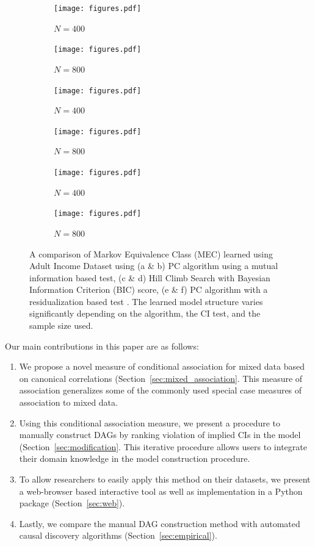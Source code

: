 \documentclass{uai2025} %
\begin{document}
\begin{figure}[t!]
\begin{subfigure}{0.25 \textwidth}
	\texttt{[image: figures.pdf]}
	\caption{$ N = 400 $}
\end{subfigure}%
\begin{subfigure}{0.25 \textwidth}
	\texttt{[image: figures.pdf]}
	\caption{$ N = 800$ }
\end{subfigure}
\begin{subfigure}{0.25 \textwidth}
	\texttt{[image: figures.pdf]}
	\caption{$ N = 400 $ }
\end{subfigure}%
\begin{subfigure}{0.25\textwidth}
	\texttt{[image: figures.pdf]}
	\caption{ $ N = 800$ }
\end{subfigure}
\begin{subfigure}{0.25 \textwidth}
	\texttt{[image: figures.pdf]}
	\caption{ $ N = 400$ }
\end{subfigure}%
\begin{subfigure}{0.25\textwidth}
	\texttt{[image: figures.pdf]}
	\caption{$ N = 800$ }
\end{subfigure}

\caption{A comparison of Markov Equivalence Class (MEC) learned using Adult Income Dataset \citep{Becker1996} using (a \& b) PC algorithm using a mutual information based test, (c \& d) Hill Climb Search with Bayesian Information Criterion (BIC) score, (e \& f) PC algorithm with a residualization based test \citep{Ankan2023}. The learned model structure varies significantly depending on the algorithm, the CI test, and the sample size used.}
\label{fig:intro}
\end{figure}


Our main contributions in this paper are as follows:
\begin{enumerate}
	\item We propose a novel measure of conditional association for mixed
		data based on canonical correlations
		(Section~\ref{sec:mixed_association}. This measure of
		association generalizes some of the commonly used special case
		measures of association to mixed data.
	\item Using this conditional association measure, we present a
		procedure to manually construct DAGs by ranking violation of
		implied CIs in the model (Section~\ref{sec:modification}. This
		iterative procedure allows users to integrate their domain
		knowledge in the model construction procedure.
	\item To allow researchers to easily apply this method on their
		datasets, we present a web-browser based interactive tool as well
		as implementation in a Python package (Section~\ref{sec:web}).
	\item Lastly, we compare the manual DAG construction method with automated
		causal discovery algorithms (Section~\ref{sec:empirical}).

\end{enumerate}
\end{document}
